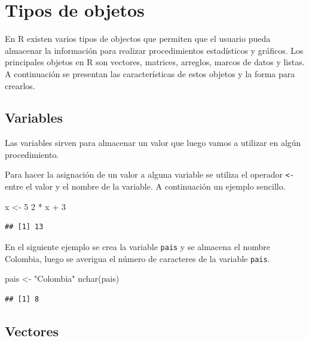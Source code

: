 \documentclass[
]{book}
\makeatletter
\newenvironment{Shaded}{\begin{snugshade}}{\end{snugshade}}
\newcommand{\DecValTok}[1]{\textcolor[rgb]{0.00,0.00,0.81}{#1}}
\newcommand{\FunctionTok}[1]{\textcolor[rgb]{0.00,0.00,0.00}{#1}}
\newcommand{\NormalTok}[1]{#1}
\newcommand{\OtherTok}[1]{\textcolor[rgb]{0.56,0.35,0.01}{#1}}
\newcommand{\SpecialCharTok}[1]{\textcolor[rgb]{0.00,0.00,0.00}{#1}}
\newcommand{\StringTok}[1]{\textcolor[rgb]{0.31,0.60,0.02}{#1}}
\newenvironment{kframe}{%
\medskip{}
\setlength{\fboxsep}{.8em}
 \def\at@end@of@kframe{}%
 \ifinner\ifhmode%
  \def\at@end@of@kframe{\end{minipage}}%
  \begin{minipage}{\columnwidth}%
 \fi\fi%
 \def\FrameCommand##1{\hskip\@totalleftmargin \hskip-\fboxsep
 \colorbox{shadecolor}{##1}\hskip-\fboxsep
     \hskip-\linewidth \hskip-\@totalleftmargin \hskip\columnwidth}%
 \MakeFramed {\advance\hsize-\width
   \@totalleftmargin\z@ \linewidth\hsize
   \@setminipage}}%
 {\par\unskip\endMakeFramed%
 \at@end@of@kframe}
\renewenvironment{Shaded}{\begin{kframe}}{\end{kframe}}
\makeatother
\begin{document}
\hypertarget{objetos}{%
\chapter{Tipos de objetos}\label{objetos}}

En R existen varios tipos de objectos que permiten que el usuario pueda almacenar la información para realizar procedimientos estadísticos y gráficos. Los principales objetos en R son vectores, matrices, arreglos, marcos de datos y listas. A continuación se presentan las características de estos objetos y la forma para crearlos.

\hypertarget{variables}{%
\section{Variables}\label{variables}}

Las variables sirven para almacenar un valor que luego vamos a utilizar en algún procedimiento.

Para hacer la asignación de un valor a alguna variable se utiliza el operador \texttt{\textless{}-} entre el valor y el nombre de la variable. A continuación un ejemplo sencillo.

\begin{Shaded}
\begin{Highlighting}[]
\NormalTok{x }\OtherTok{\textless{}{-}} \DecValTok{5}
\DecValTok{2} \SpecialCharTok{*}\NormalTok{ x }\SpecialCharTok{+} \DecValTok{3}
\end{Highlighting}
\end{Shaded}

\begin{verbatim}
## [1] 13
\end{verbatim}

En el siguiente ejemplo se crea la variable \texttt{pais} y se almacena el nombre Colombia, luego se averigua el número de caracteres de la variable \texttt{pais}.

\begin{Shaded}
\begin{Highlighting}[]
\NormalTok{pais }\OtherTok{\textless{}{-}} \StringTok{"Colombia"}
\FunctionTok{nchar}\NormalTok{(pais)}
\end{Highlighting}
\end{Shaded}

\begin{verbatim}
## [1] 8
\end{verbatim}

\hypertarget{vectores}{%
\section{\texorpdfstring{Vectores  \label{vector}}{Vectores  }}\label{vectores}}
\end{document}
